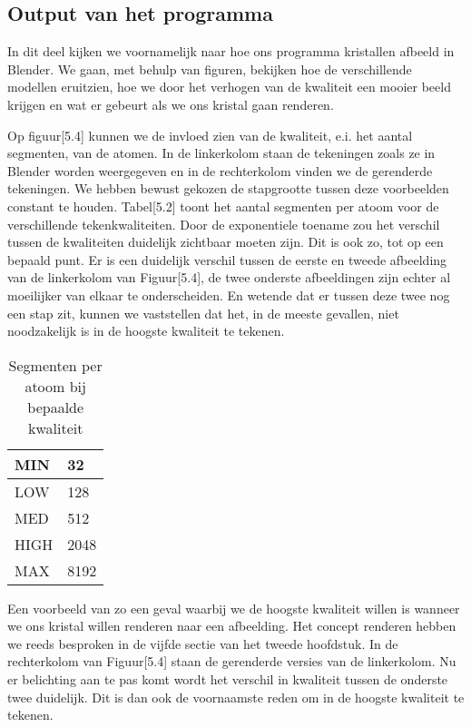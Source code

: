 \subsection{Output van het programma}
In dit deel kijken we voornamelijk naar hoe ons programma kristallen afbeeld in Blender. We gaan, met behulp van figuren, bekijken hoe de verschillende modellen eruitzien, hoe we door het verhogen van de kwaliteit een mooier beeld krijgen en wat er gebeurt als we ons kristal gaan renderen.
\par
Op figuur[5.4] kunnen we de invloed zien van de kwaliteit, e.i. het aantal segmenten, van de atomen. In de linkerkolom staan de tekeningen zoals ze in Blender worden weergegeven en in de rechterkolom vinden we de gerenderde tekeningen. We hebben bewust gekozen de stapgrootte tussen deze voorbeelden constant te houden. Tabel[5.2] toont het aantal segmenten per atoom voor de verschillende tekenkwaliteiten. Door de exponentiele toename zou het verschil tussen de kwaliteiten duidelijk zichtbaar moeten zijn. Dit is ook zo, tot op een bepaald punt. Er is een duidelijk verschil tussen de eerste en tweede afbeelding van de linkerkolom van Figuur[5.4], de twee onderste afbeeldingen zijn echter al moeilijker van elkaar te onderscheiden. En wetende dat er tussen deze twee nog een stap zit, kunnen we vaststellen dat het, in de meeste gevallen, niet noodzakelijk is in de hoogste kwaliteit te tekenen.   
\par
\begin{table}[H]
\begin{tabular}{|l|l|}
\hline
MIN  & 32   \\ \hline
LOW  & 128  \\ \hline
MED  & 512  \\ \hline
HIGH & 2048 \\ \hline
MAX  & 8192 \\ \hline
\end{tabular}
\caption{Segmenten per atoom bij bepaalde kwaliteit}
\end{table}
\par
Een voorbeeld van zo een geval waarbij we de hoogste kwaliteit willen is wanneer we ons kristal willen renderen naar een afbeelding. Het concept renderen hebben we reeds besproken in de vijfde sectie van het tweede hoofdstuk. In de rechterkolom van Figuur[5.4] staan de gerenderde versies van de linkerkolom. Nu er belichting aan te pas komt wordt het verschil in kwaliteit tussen de onderste twee duidelijk. Dit is dan ook de voornaamste reden om in de hoogste kwaliteit te tekenen.   
\par


